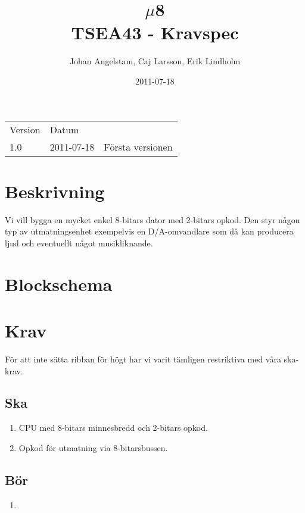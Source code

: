 \documentclass[a4paper,8pt]{article}
\title{\huge{$\mu$8} \vspace{1cm}\\ 
  \large{TSEA43 - Kravspec}}
\author{Johan Angelstam, Caj Larsson, Erik Lindholm}
\date{2011-07-18}
\begin{document}
\maketitle
\vfill
\begin{tabular}{ l l l }
  Version & Datum & \\
  1.0     & 2011-07-18 & Första versionen \\
\end{tabular}

\thispagestyle{empty}

\pagebreak

\section{Beskrivning}
Vi vill bygga en mycket enkel 8-bitars dator med 2-bitars
opkod. Den styr någon typ av utmatningsenhet exempelvis en
D/A-omvandlare som då kan producera ljud och eventuellt något
musikliknande.

\section{Blockschema}
\begin{figure}[h]
\centering
{}
\end{figure}

\section{Krav}
För att inte sätta ribban för högt har vi varit tämligen restriktiva med våra
 ska-krav.

\subsection{Ska}
\begin{enumerate}
  \item CPU med 8-bitars minnesbredd och 2-bitars opkod.
  \item Opkod för utmatning via 8-bitarsbussen.
\end{enumerate}

\subsection{Bör}
\begin{enumerate}
  \item 
\end{enumerate}
\end{document}

